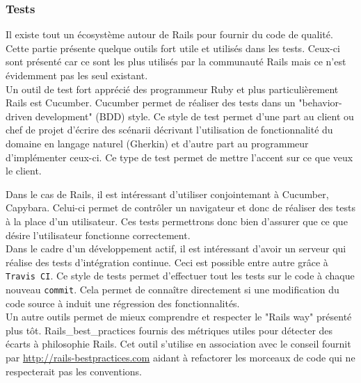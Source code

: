 \subsubsection{Tests}
Il existe tout un écosystème autour de Rails pour fournir du code de qualité. Cette partie présente quelque outils fort utile et utilisés dans les tests. Ceux-ci sont présenté car ce sont les plus utilisés par la communauté Rails mais ce n'est évidemment pas les seul existant.\\

Un outil de test fort apprécié des programmeur Ruby et plus particulièrement Rails est Cucumber. Cucumber permet de réaliser des tests dans un "behavior-driven development" (BDD) style. Ce style de test permet d'une part au client ou chef de projet d'écrire des scénarii décrivant l'utilisation de fonctionnalité du domaine en langage naturel (Gherkin) et d'autre part au programmeur d'implémenter ceux-ci. Ce type de test permet de mettre l'accent sur ce que veux le client.

Dans le cas de Rails, il est intéressant d'utiliser conjointemant à Cucumber, Capybara. Celui-ci permet de contrôler un navigateur et donc de réaliser des tests à la place d'un utilisateur. Ces tests permettrons donc bien d'assurer que ce que désire l'utilisateur fonctionne correctement.\\

Dans le cadre d'un développement actif, il est intéressant d'avoir un serveur qui réalise des tests d'intégration continue. Ceci est possible entre autre grâce à \texttt{Travis CI}. Ce style de tests permet d'effectuer tout les tests sur le code à chaque nouveau \texttt{commit}. Cela permet de connaître directement si une modification du code source à induit une régression des fonctionnalités.\\

Un autre outils permet de mieux comprendre et respecter le "Rails way" présenté plus tôt. Rails\_best\_practices fournis des métriques utiles pour détecter des écarts à philosophie Rails. Cet outil s'utilise en association avec le conseil fournit par \url{http://rails-bestpractices.com} aidant à refactorer les morceaux de code qui ne respecterait pas les conventions.
